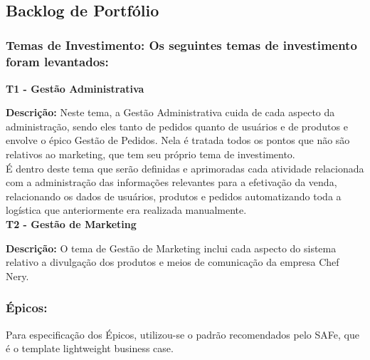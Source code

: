 \tab \\ \\ \\

\subsection{Backlog de Portfólio}

\subsubsection{Temas de Investimento: Os seguintes temas de investimento foram levantados:}

\textbf{T1 - Gestão Administrativa}

\textbf{Descrição:} Neste tema, a Gestão Administrativa cuida de cada aspecto da administração, sendo eles tanto de pedidos quanto de usuários e de produtos e envolve o épico Gestão de Pedidos. Nela é tratada todos os pontos que não são relativos ao marketing, que tem seu próprio tema de investimento. \\
\tab É dentro deste tema que serão definidas e aprimoradas cada atividade relacionada com a administração das informações relevantes para a efetivação da venda, relacionando os dados de usuários, produtos e pedidos automatizando toda a logística que anteriormente era realizada manualmente.\\

\textbf{T2 - Gestão de Marketing}

\textbf{Descrição:} O tema de Gestão de Marketing inclui cada aspecto do sistema relativo a divulgação dos produtos e meios de comunicação da empresa Chef Nery. \\

\subsubsection{\textbf{Épicos:}} 
Para especificação dos Épicos, utilizou-se o padrão recomendados pelo SAFe, que é o template lightweight business case.\\

\tab \\ \\ \\

